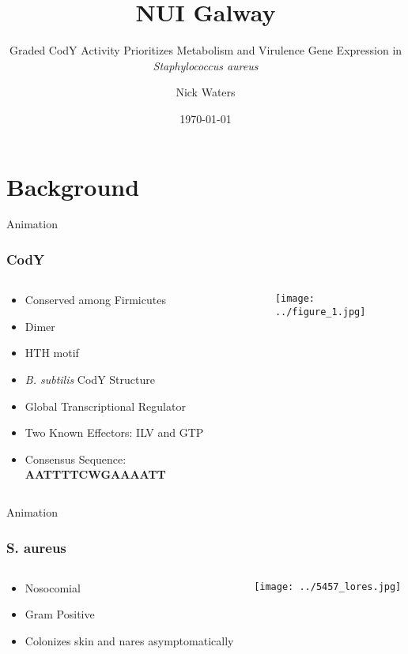 \documentclass[10pt, compress]{beamer}
\title{NUI Galway}
\subtitle{Graded CodY Activity Prioritizes Metabolism and Virulence Gene Expression in 	\textit{Staphylococcus aureus}}
\date{\today}
\author{Nick Waters}
\institute{Brinsmade Lab, Biology Department, Georgetown University}
\begin{document}
\maketitle

\section{Background}
  \begin{frame}{Animation}
  \frametitle{CodY}
\begin{minipage}[0.2\textheight]{\textwidth}
  \begin{columns}[T]
\begin{column}{0.5\textwidth}
\begin{itemize}[<+- | alert@+>]
    \item Conserved among Firmicutes
    \item Dimer
    \item HTH motif 
    \item \textit{B. subtilis} CodY Structure
    \item Global Transcriptional Regulator
    \item Two Known Effectors: ILV and GTP
    \item Consensus Sequence: \textbf{AATTTTCWGAAAATT}
\end{itemize}
\end{column}
\begin{column}{0.5\textwidth}
\texttt{[image: ../figure\_1.jpg]}
\end{column}
\end{columns}
\end{minipage}
\end{frame}

\begin{frame}{Animation}
  \frametitle{S. aureus}
\begin{minipage}[0.2\textheight]{\textwidth}
  \begin{columns}[T]
\begin{column}{0.5\textwidth}
\begin{itemize}[<+- | alert@+>]
    \item \alert<4>{Nosocomial }
    \item Gram Positive
    \item Colonizes skin and nares asymptomatically
\end{itemize}
\end{column}

\begin{column}{0.5\textwidth}
\texttt{[image: ../5457\_lores.jpg]}
\end{column}
\end{columns}
\end{minipage}
\end{frame}
\end{document}
